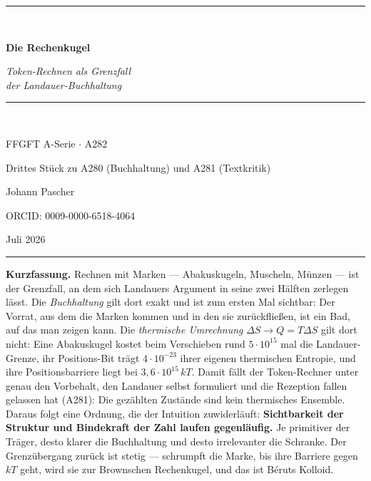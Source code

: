 \documentclass[11pt,a4paper]{article}
\begin{document}
\begin{titlepage}
\centering
\vspace*{2.2cm}
{\color{rulecol}\rule{0.5\textwidth}{0.6pt}}\\[1.4cm]
{\color{accent}\Huge\bfseries Die Rechenkugel\par}
\vspace{1.0cm}
{\large\itshape Token-Rechnen als Grenzfall\\ der Landauer-Buchhaltung\par}
\vspace{0.6cm}
{\color{accent2}\rule{0.28\textwidth}{0.4pt}}\\[1.0cm]
{\large FFGFT A-Serie $\cdot$ A282\par}
\vspace{0.4cm}
{\normalsize Drittes Stück zu A280 (Buchhaltung) und A281 (Textkritik)\par}
\vfill
{\large Johann Pascher\par}
\vspace{0.3cm}
{\footnotesize ORCID: 0009-0000-6518-4064\par}
\vspace{0.2cm}
{\footnotesize Juli 2026\par}
\vspace{1.4cm}
{\color{rulecol}\rule{0.5\textwidth}{0.6pt}}
\vspace*{1.5cm}
\end{titlepage}

\tableofcontents
\thispagestyle{fancy}
\clearpage

\begingroup\small\noindent
\textbf{Kurzfassung.} Rechnen mit Marken --- Abakuskugeln, Muscheln, Münzen ---
ist der Grenzfall, an dem sich Landauers Argument in seine zwei Hälften zerlegen
lässt. Die \emph{Buchhaltung} gilt dort exakt und ist zum ersten Mal sichtbar: Der
Vorrat, aus dem die Marken kommen und in den sie zurückfließen, ist ein Bad, auf
das man zeigen kann. Die \emph{thermische Umrechnung} $\Delta S \to Q = T\Delta S$
gilt dort nicht: Eine Abakuskugel kostet beim Verschieben rund $5\cdot10^{15}$ mal
die Landauer-Grenze, ihr Positions-Bit trägt $4\cdot10^{-23}$ ihrer eigenen
thermischen Entropie, und ihre Positionsbarriere liegt bei $3{,}6\cdot10^{15}\,kT$.
Damit fällt der Token-Rechner unter genau den Vorbehalt, den Landauer selbst
formuliert und die Rezeption fallen gelassen hat (A281): Die gezählten Zustände
sind kein thermisches Ensemble. Daraus folgt eine Ordnung, die der Intuition
zuwiderläuft: \textbf{Sichtbarkeit der Struktur und Bindekraft der Zahl laufen
gegenläufig.} Je primitiver der Träger, desto klarer die Buchhaltung und desto
irrelevanter die Schranke. Der Grenzübergang zurück ist stetig --- schrumpft die
Marke, bis ihre Barriere gegen $kT$ geht, wird sie zur Brownschen Rechenkugel, und
das ist Béruts Kolloid.
\par\endgroup
\end{document}
